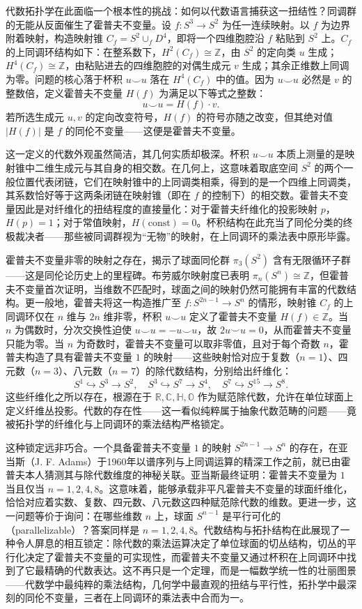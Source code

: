 \documentclass[12pt,a4paper]{article}
\begin{document}
代数拓扑学在此面临一个根本性的挑战：如何以代数语言捕获这一扭结性？同调群的无能从反面催生了霍普夫不变量。设 $f: S^3 \to S^2$ 为任一连续映射。以 $f$ 为边界附着映射，构造映射锥 $C_f = S^2 \cup_f D^4$，即将一个四维胞腔沿 $f$ 粘贴到 $S^2$ 上。$C_f$ 的上同调环结构如下：在整系数下，$H^2(C_f) \cong \mathbb{Z}$，由 $S^2$ 的定向类 $u$ 生成；$H^4(C_f) \cong \mathbb{Z}$，由粘贴进去的四维胞腔的对偶生成元 $v$ 生成；其余正维数上同调为零。问题的核心落于杯积 $u \smile u$ 落在 $H^4(C_f)$ 中的值。因为 $u \smile u$ 必然是 $v$ 的整数倍，定义霍普夫不变量 $H(f)$ 为满足以下等式之整数：
$$
u \smile u = H(f) \cdot v.
$$
若所选生成元 $u, v$ 的定向改变符号，$H(f)$ 的符号亦随之改变，但其绝对值 $|H(f)|$ 是 $f$ 的同伦不变量——这便是霍普夫不变量。

这一定义的代数外观虽然简洁，其几何实质却极深。杯积 $u \smile u$ 本质上测量的是映射锥中二维生成元与其自身的相交数。在几何上，这意味着取底空间 $S^2$ 的两个一般位置代表闭链，它们在映射锥中的上同调类相乘，得到的是一个四维上同调类，其系数恰好等于这两条闭链在映射锥（即在 $f$ 的控制下）的相交数。霍普夫不变量因此是对纤维化的扭结程度的直接量化：对于霍普夫纤维化的投影映射 $p$，$H(p) = 1$；对于常值映射，$H(\text{const}) = 0$。杯积结构在此充当了同伦分类的终极裁决者——那些被同调群视为“无物”的映射，在上同调环的乘法表中原形毕露。

霍普夫不变量非零的映射之存在，揭示了球面同伦群 $\pi_3(S^2)$ 含有无限循环子群——这是同伦论历史上的里程碑。布劳威尔映射度已表明 $\pi_n(S^n) \cong \mathbb{Z}$，但霍普夫不变量首次证明，当维数不匹配时，球面之间的映射仍然可能拥有丰富的代数结构。更一般地，霍普夫将这一构造推广至 $f: S^{2n-1} \to S^n$ 的情形，映射锥 $C_f$ 的上同调环仅在 $n$ 维与 $2n$ 维非零，杯积 $u \smile u$ 定义了霍普夫不变量 $H(f) \in \mathbb{Z}$。当 $n$ 为偶数时，分次交换性迫使 $u \smile u = -u \smile u$，故 $2u \smile u = 0$，从而霍普夫不变量只能为零。当 $n$ 为奇数时，霍普夫不变量可以取非零值，且对于每个奇数 $n$，霍普夫构造了具有霍普夫不变量 $1$ 的映射——这些映射恰对应于复数（$n=1$）、四元数（$n=3$）、八元数（$n=7$）的除代数结构，分别给出纤维化：
$$
S^1 \hookrightarrow S^3 \to S^2,\quad S^3 \hookrightarrow S^7 \to S^4,\quad S^7 \hookrightarrow S^{15} \to S^8.
$$
这些纤维化之所以存在，根源在于 $\mathbb{R}, \mathbb{C}, \mathbb{H}, \mathbb{O}$ 作为赋范除代数，允许在单位球面上定义纤维丛投影。代数的存在性——这一看似纯粹属于抽象代数范畴的问题——竟被拓扑学的纤维化与上同调环的乘法结构严格锁定。

这种锁定远非巧合。一个具备霍普夫不变量 $1$ 的映射 $S^{2n-1} \to S^n$ 的存在，在亚当斯（J. F. Adams）于1960年以谱序列与上同调运算的精深工作之前，就已由霍普夫本人猜测其与除代数维度的神秘关联。亚当斯最终证明：霍普夫不变量为 $1$ 当且仅当 $n = 1, 2, 4, 8$。这意味着，能够承载非平凡霍普夫不变量的球面纤维化，恰恰对应着实数、复数、四元数、八元数这四种赋范除代数的维数。更进一步，这一问题等价于询问：在哪些维数 $n$ 上，球面 $S^{n-1}$ 是平行可化的（parallelizable）？答案同样是 $n = 1, 2, 4, 8$。代数结构与拓扑结构在此展现了一种令人屏息的相互锁定：除代数的乘法运算决定了单位球面的切丛结构，切丛的平行化决定了霍普夫不变量的可实现性，而霍普夫不变量又通过杯积在上同调环中找到了它最精确的代数表达。这不再只是一个定理，而是一幅数学统一性的壮丽图景——代数学中最纯粹的乘法结构，几何学中最直观的扭结与平行性，拓扑学中最深刻的同伦不变量，三者在上同调环的乘法表中合而为一。
\end{document}
